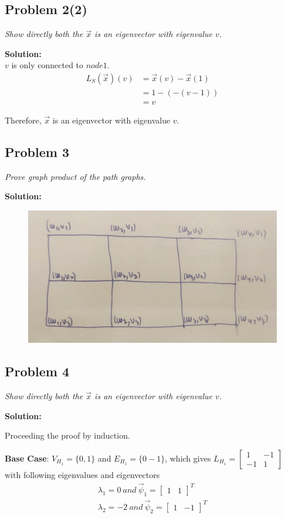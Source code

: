 \documentclass[12pt,a4paper]{article}
\newcommand{\solution}{\noindent\textbf{Solution:}\\\indent}
\begin{document}
\newpage
\subsection*{Problem 2(2)}
\textit{
    Show directly both the $\vec{x}$ is an eigenvector with eigenvalue $v$.
}

\solution
$v$ is only connected to $node 1$.
\begin{align*}
    L_S(\vec{x})(v) &= \vec{x}(v) - \vec{x}(1) \\
                    &= 1 - (-(v-1)) \\
                    &= v
\end{align*}

Therefore, $\vec{x}$ is an eigenvector with eigenvalue $v$.

\subsection*{Problem 3}
\textit{
    Prove graph product of the path graphs.
}

\solution
\begin{figure}[H]
    \centering
    \includegraphics[width=12cm]{01.jpg}
\end{figure}

\newpage
\subsection*{Problem 4}
\textit{
    Show directly both the $\vec{x}$ is an eigenvector with eigenvalue $v$.
}

\solution

Proceeding the proof by induction.

\textbf{Base Case}: $V_{H_1} = \{0,1\}$ and $E_{H_1}=\{0-1\}$, which gives $L_{H_1}=\begin{bmatrix}1 & -1 \\ -1 & 1\end{bmatrix}$ with following eigenvalues and eigenvectors
\begin{align*}
    \lambda_1 = 0\ and\ \vec{\psi}_1 = \begin{bmatrix}1& 1\end{bmatrix}^T \\
    \lambda_2 = -2\ and\ \vec{\psi}_2 = \begin{bmatrix}1& -1\end{bmatrix}^T
\end{align*}
\end{document}
